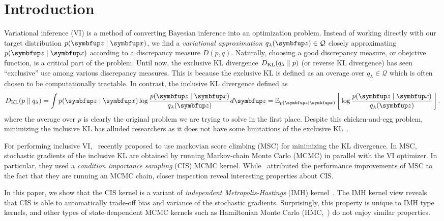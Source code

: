 
\section{Introduction}
Variational inference (VI) is a method of converting Bayesian inference into an optimization problem.
Instead of working directly with our target distribution \(p(\vz\mid\vx)\), we find a \textit{variational approximation} \(q_{\lambda}(\vz) \in \mathcal{Q}\) closely approximating \(p(\vz\mid\vx)\) according to a discrepancy measure \(D(p, q)\).
Naturally, choosing a good discrepancy measure, or obejctive function, is a critical part of the problem.
Until now, the exclusive KL divergence \(D_{\mathrm{KL}}(q_{\lambda}\parallel p)\) (or reverse KL divergence) has seen ``exclusive'' use among various discrepancy measures.
This is because the exclusive KL is defined as an overage over \(q_{\lambda} \in \mathcal{Q}\) which is often chosen to be computationally tractable.
In contrast, the inclusive KL divergence defined as
%
\begin{align}
  \DKL{p}{q_{\lambda}} = \int p(\vz\mid\vx) \log \frac{p(\vz\mid\vx)}{q_{\lambda}(\vz)} d\vz
  = \Esub{p(\vz\mid\vx)}{\log \frac{p(\vz\mid\vx)}{q_{\lambda}(\vz)}}. \label{eq:klpq}
\end{align}
%
where the average over \(p\) is clearly the original problem we are trying to solve in the first place.
Despite this chicken-and-egg problem, minimizing the inclusive KL has alluded researchers as it does not have some limitations of the exclusive KL~\citep{minka2005divergence, mackay_local_2001}.

For performing inclusive VI,~\citet{NEURIPS2020_b2070693} recently proposed to use markovian score climbing (MSC) for minimizing the KL divergence.
In MSC, stochastic gradients of the inclusive KL are obtained by running Markov-chain Monte Carlo (MCMC) in parallel with the VI optimizer.
In particular, they used a \textit{condition importance sampling} (CIS) MCMC kernel.
While~\citeauthor{NEURIPS2020_b2070693} attributed the performance improvements of MSC to the fact that they are running an MCMC chain, closer inspection reveal interesting properties about CIS.

In this paper, we show that the CIS kernel is a variant of \textit{independent Metropolis-Hastings} (IMH) kernel~\citep{robert_monte_2004}.
The IMH kernel view reveals that CIS is able to automatically trade-off bias and variance of the stochastic gradients.
Surprisingly, this property is unique to IMH type kernels, and other types of state-denpendent MCMC kernels such as Hamiltonian Monte Carlo (HMC,~\citealt{duane_hybrid_1987, neal_mcmc_2011, betancourt_conceptual_2017}) do not enjoy similar properties.

